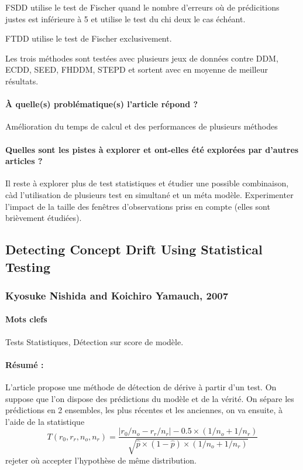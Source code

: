 \documentclass[11pt,a4paper]{report}
\begin{document}
FSDD utilise le test de Fischer quand le nombre d'erreurs où de prédicitions justes est inférieure à 5 et utilise le test du chi deux le cas échéant.

FTDD utilise le test de Fischer exclusivement.

Les trois méthodes sont testées avec plusieurs jeux de données contre DDM, ECDD, SEED, FHDDM, STEPD et sortent avec en moyenne de meilleur résultats.
\paragraph{À quelle(s) problématique(s) l'article répond ?} Amélioration du temps de calcul et des performances de plusieurs méthodes

\paragraph{Quelles sont les pistes à explorer et ont-elles été explorées par d'autres articles ?} Il reste à explorer plus de test statistiques et étudier une possible combinaison, càd l'utilisation de plusieurs test en simultané et un méta modèle. Experimenter l'impact de la taille des fenêtres d'observations priss en compte (elles sont brièvement étudiées).



\subsection{Detecting Concept Drift Using Statistical Testing}
\subsubsection{Kyosuke Nishida and Koichiro Yamauch, 2007}

\paragraph{Mots clefs} Tests Statistiques, Détection sur score de modèle.

\paragraph{Résumé :} L'article propose une méthode de détection de dérive à partir d'un test. On suppose que l'on dispose des prédictions du modèle et de la vérité. On sépare les prédictions en 2 ensembles, les plus récentes et les anciennes, on va ensuite, à l'aide de la statistique $$T\left(r_{0}, r_{r}, n_{o}, n_{r}\right)=\frac{\left|r_{0} / n_{o}-r_{r} / n_{r}\right|-0.5 \times\left(1 / n_{o}+1 / n_{r}\right)}{\sqrt{\hat{p} \times(1-\hat{p}) \times\left(1 / n_{o}+1 / n_{r}\right)}}$$ rejeter où accepter l'hypothèse de même distribution. 
\end{document}
